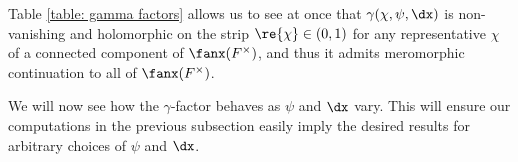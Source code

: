 \documentclass[11pt, x11names, openany]{book}
\begin{document}
\begin{table}[h!]
\begin{center}
\caption{The local gamma factors with inputs from Table \ref{table: standard functions}, again omitted for sake of space. }
\label{table: gamma factors}
\end{center}
\end{table}

Table \ref{table: gamma factors} allows us to see at once that $\gamma(\chi, \psi, \dx)$ is non-vanishing and holomorphic on the strip $\re{\chi} \in (0, 1)$ for any representative $\chi$ of a connected component of $\fanx(F^\times)$, and thus it admits meromorphic continuation to all of $\fanx(F^\times)$.



We will now see how the $\gamma$-factor behaves as $\psi$ and $\dx$ vary. This will ensure our computations in the previous subsection easily imply the desired results for arbitrary choices of $\psi$ and $\dx$.
\end{document}
